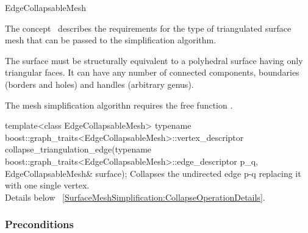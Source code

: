 
\begin{ccRefConcept}{EdgeCollapsableMesh}


\ccDefinition

The concept \ccRefName\ describes the requirements for the type of 
triangulated surface mesh that can be passed to the
simplification algorithm.

The surface must be structurally equivalent to a polyhedral surface
having only triangular faces. 
It can have any number of connected components, boundaries 
(borders and holes) and handles (arbitrary genus).

\ccRefines
{}


The mesh simplification algorithn requires the free function .


  \ccFunction
  {template<class EdgeCollapsableMesh>
  typename boost::graph_traits<EdgeCollapsableMesh>::vertex_descriptor
  collapse_triangulation_edge(typename boost::graph_traits<EdgeCollapsableMesh>::edge_descriptor p_q,
                             EdgeCollapsableMesh& surface);}  
  {Collapses the undirected edge p-q replacing it with one single vertex.\\ 
  Details below ~\ref{SurfaceMeshSimplification:CollapseOperationDetails}.
  }

    
\label{SurfaceMeshSimplification:CollapseOperationDetails}
  
\subsubsection*{Preconditions}


\end{ccRefConcept}
